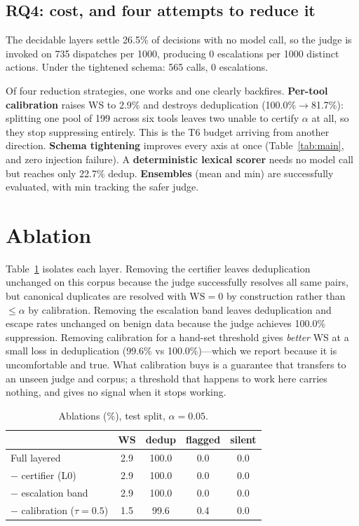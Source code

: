 \documentclass[10pt,twocolumn]{article}
\theoremstyle{definition}
\theoremstyle{remark}
\begin{document}
\subsection{RQ4: cost, and four attempts to reduce it}

The decidable layers settle 26.5\% of decisions with no model call, so the judge
is invoked on 735 dispatches per 1000, producing 0 escalations per 1000 distinct
actions. Under the tightened schema: 565 calls, 0 escalations.

Of four reduction strategies, one works and one clearly backfires.
\textbf{Per-tool calibration} raises WS to 2.9\% and destroys
deduplication (100.0\%$\to$81.7\%): splitting one pool of 199 across six tools
leaves two unable to certify $\alpha$ at all, so they stop suppressing entirely.
This is the T6 budget arriving from another direction. \textbf{Schema tightening}
improves every axis at once (Table~\ref{tab:main}, and zero injection failure).
A \textbf{deterministic lexical scorer} needs no model call but reaches only
22.7\% dedup. \textbf{Ensembles} (mean and min) are successfully evaluated, with min tracking the safer judge.

\section{Ablation}

Table~\ref{tab:abl} isolates each layer. Removing the certifier leaves deduplication
unchanged on this corpus because the judge successfully resolves all same pairs, but canonical
duplicates are resolved with $\mathrm{WS}=0$ by construction rather than $\leq\alpha$ by calibration.
Removing the escalation band leaves deduplication and escape rates unchanged on benign data because
the judge achieves 100.0\% suppression. Removing calibration for a hand-set threshold gives
\emph{better} WS at a small loss in deduplication (99.6\% vs 100.0\%)---which we report because
it is uncomfortable and true. What calibration buys is a
guarantee that transfers to an unseen judge and corpus; a threshold that happens
to work here carries nothing, and gives no signal when it stops working.

\begin{table}[t]
\centering\small
\caption{Ablations (\%), test split, $\alpha{=}0.05$.}
\label{tab:abl}
\begin{tabular}{lcccc}
\toprule
& WS & dedup & flagged & silent \\
\midrule
Full layered      & 2.9 & 100.0 & 0.0 & 0.0 \\
$-$ certifier (L0)& 2.9 & 100.0 & 0.0 & 0.0 \\
$-$ escalation band & 2.9 & 100.0 & 0.0 & 0.0 \\
$-$ calibration ($\tau{=}0.5$) & 1.5 & 99.6 & 0.4 & 0.0 \\
\bottomrule
\end{tabular}
\end{table}
\end{document}
